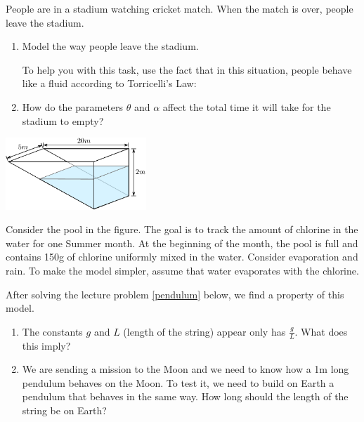 \begin{exercises}
\begin{problist}
	\prob People are in a stadium watching cricket match. When the match is over, people leave the stadium. 
	
	\begin{enumerate}
	\item Model the way people leave the stadium.
	
	To help you with this task, use the fact that in this situation, people behave like a fluid according to Torricelli's Law:
	
		\begin{center}
		\end{center}

	\item How do the parameters $\theta$ and $\alpha$ affect the total time it will take for the stadium to empty?
	\end{enumerate}
	
	\begin{center}
		\includegraphics*[width=150pt]{images/module11-pool.pdf}
	\end{center}
	
	
	\prob Consider the pool in the figure. The goal is to track the amount of chlorine in the water for one Summer month. At the beginning of the month, the pool is full and contains 150g of chlorine uniformly mixed in the water. Consider evaporation and rain. To make the model simpler, assume that water evaporates with the chlorine.
	
	
	
	\prob After solving the lecture problem \ref{pendulum} below, we find a property of this model. 
	\begin{enumerate}
		\item The constants $g$ and $L$ (length of the string) appear only has $\frac{g}{L}$. What does this imply?
		\item We are sending a mission to the Moon and we need to know how a 1m long pendulum behaves on the Moon. To test it, we need to build on Earth a pendulum that behaves in the same way. How long should the length of the string be on Earth?
	\end{enumerate}
	


\end{problist}
\end{exercises}
